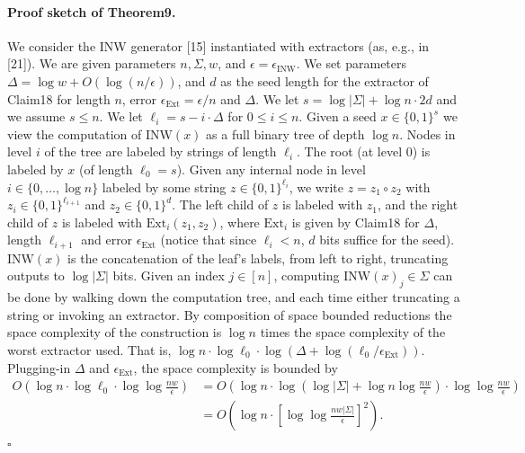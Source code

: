 \documentclass[10pt,a4paper]{article}
\begin{document}
\paragraph{Proof sketch of Theorem9.}
We consider the INW generator [15] instantiated with extractors (as, e.g., in [21]). We are given parameters $n,\Sigma,w$, and $\epsilon=\epsilon_{\mathrm{INW}}$. We set parameters $\Delta=\log w+O(\log(n/\epsilon))$, and $d$ as the seed length for the extractor of Claim18 for length $n$, error $\epsilon_{\mathrm{Ext}}=\epsilon/n$ and $\Delta$. We let $s=\log|\Sigma|+\log n\cdot2d$ and we assume $s\le n$. We let $\ell_i=s-i\cdot\Delta$ for $0\le i\le n$.
Given a seed $x\in\{0,1\}^s$ we view the computation of $\mathrm{INW}(x)$ as a full binary tree of depth $\log n$. Nodes in level $i$ of the tree are labeled by strings of length $\ell_i$. The root (at level 0) is labeled by $x$ (of length $\ell_0=s$). Given any internal node in level $i\in\{0,\ldots,\log n\}$ labeled by some string $z\in\{0,1\}^{\ell_i}$, we write $z=z_1\circ z_2$ with $z_i\in\{0,1\}^{\ell_{i+1}}$ and $z_2\in\{0,1\}^d$. The left child of $z$ is labeled with $z_1$, and the right child of $z$ is labeled with $\mathrm{Ext}_i(z_1,z_2)$, where $\mathrm{Ext}_i$ is given by Claim18 for $\Delta$, length $\ell_{i+1}$ and error $\epsilon_{\mathrm{Ext}}$ (notice that since $\ell_i<n$, $d$ bits suffice for the seed). $\mathrm{INW}(x)$ is the concatenation of the leaf's labels, from left to right, truncating outputs to $\log|\Sigma|$ bits.
Given an index $j\in[n]$, computing $\mathrm{INW}(x)_j\in\Sigma$ can be done by walking down the computation tree, and each time either truncating a string or invoking an extractor. By composition of space bounded reductions the space complexity of the construction is $\log n$ times the space complexity of the worst extractor used. That is, $\log n\cdot\log\ell_0\cdot\log(\Delta+\log(\ell_0/\epsilon_{\mathrm{Ext}}))$. Plugging-in $\Delta$ and $\epsilon_{\mathrm{Ext}}$, the space complexity is bounded by
\begin{align*}
O\left(\log n\cdot\log\ell_0\cdot\log\log\frac{nw}\epsilon\right)
&=O\left(\log n\cdot\log\left(\log|\Sigma|+\log n\log\frac{nw}\epsilon\right)\cdot\log\log\frac{nw}\epsilon\right)\\
&=O\left(\log n\cdot\left[\log\log\frac{nw|\Sigma|}\epsilon\right]^2\right).
\end{align*}
\hfill$\square$
\end{document}
